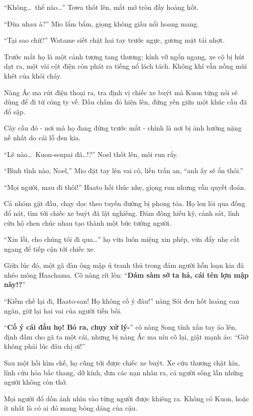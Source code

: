 \documentclass[../main.tex]{subfiles}
\begin{document}
``Không\dots\ thể nào\dots'' Towa thốt lên, mắt mở tròn đầy hoảng hốt.

``Đùa nhau à?'' Mio lẩm bẩm, giọng không giấu nổi hoang mang.

``Tại sao chứ?'' Watame siết chặt hai tay trước ngực, gương mặt tái nhợt.

Trước mắt họ là một cảnh tượng tang thương: kính vỡ ngổn ngang, xe cộ bị hút dạt ra, một vài cột điện còn phát ra tiếng nổ lách tách. Không khí vẫn nồng mùi khét của khói cháy.

Nàng Ác ma rút điện thoại ra, tra định vị chiếc xe buýt mà Kuon từng nói sẽ dùng để đi từ công ty về. Dấu chấm đỏ hiện lên, đứng yên giữa một khúc cầu đã đổ sập.

Cây cầu đó - nơi mà họ đang đứng trước mắt - chính là nơi bị ảnh hưởng nặng nề nhất do cái lỗ đen kia.

``Lẽ nào\dots\ Kuon-senpai đã\dots!?'' Noel thốt lên, môi run rẩy.

``Bình tĩnh nào, Noel,'' Mio đặt tay lên vai cô, liền trấn an, ``anh ấy sẽ ổn thôi.''

``Mọi người, mau đi thôi!'' Haato hối thúc nhẹ, giọng run nhưng vẫn quyết đoán.

Cả nhóm gật đầu, chạy dọc theo tuyến đường bị phong tỏa. Họ len lỏi qua đống đổ nát, tìm tới chiếc xe buýt đã lật nghiêng. Đám đông hiếu kỳ, cảnh sát, lính cứu hộ chen chúc nhau tạo thành một bức tường người.

``Xin lỗi, cho chúng tôi đi qua\dots'' họ vừa luôn miệng xin phép, vừa đẩy nhẹ cắt ngang để tiếp cận tới chiếc xe.

Giữa lúc đó, một gã đàn ông mập ú tranh thủ trong đám người hỗn loạn kia đã nhéo mông Haachama. Cô nàng rít lên: ``\textbf{Dám sàm sỡ ta hả, cái tên lợn mập này!?}''

``Kiềm chế lại đi, Haato-san! Họ không cố ý đâu!'' nàng Sói đen hốt hoảng can ngăn, giữ lại hai vai của người tiền bối.

``\textbf{Cố ý cái đầu họ! Bỏ ra, chụy xử lý-}'' cô nàng Song tính xắn tay áo lên, định đấm cho gã ta một cái, nhưng bị nàng Ác ma níu cô lại, giật mạnh áo: ``Giờ không phải lúc đâu chị ơi!''

Sau một hồi kìm chế, họ cũng tới được chiếc xe buýt. Xe cứu thương chật kín, lính cứu hỏa bắc thang, dỡ kính, đưa các nạn nhân ra, cả người sống lẫn những người không còn thở.

Mọi người đổ dồn ánh nhìn vào từng người được khiêng ra. Không có Kuon, hoặc ít nhất là có ai đó mang bóng dáng của cậu.
\end{document}
